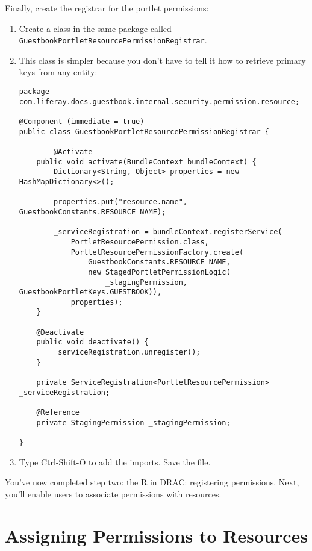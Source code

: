 Finally, create the registrar for the portlet permissions:

\begin{enumerate}
\def\labelenumi{\arabic{enumi}.}
\item
  Create a class in the same package called
  \texttt{GuestbookPortletResourcePermissionRegistrar}.
\item
  This class is simpler because you don't have to tell it how to
  retrieve primary keys from any entity:

\begin{verbatim}
package com.liferay.docs.guestbook.internal.security.permission.resource;

@Component (immediate = true)
public class GuestbookPortletResourcePermissionRegistrar {

        @Activate
    public void activate(BundleContext bundleContext) {
        Dictionary<String, Object> properties = new HashMapDictionary<>();

        properties.put("resource.name", GuestbookConstants.RESOURCE_NAME);

        _serviceRegistration = bundleContext.registerService(
            PortletResourcePermission.class,
            PortletResourcePermissionFactory.create(
                GuestbookConstants.RESOURCE_NAME,
                new StagedPortletPermissionLogic(
                    _stagingPermission, GuestbookPortletKeys.GUESTBOOK)),
            properties);
    }

    @Deactivate
    public void deactivate() {
        _serviceRegistration.unregister();
    }

    private ServiceRegistration<PortletResourcePermission> _serviceRegistration;

    @Reference
    private StagingPermission _stagingPermission;

}
\end{verbatim}
\item
  Type Ctrl-Shift-O to add the imports. Save the file.
\end{enumerate}

You've now completed step two: the R in DRAC: registering permissions.
Next, you'll enable users to associate permissions with resources.

\chapter{Assigning Permissions to
Resources}\label{assigning-permissions-to-resources}

